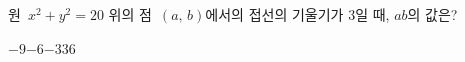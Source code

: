 원~$x^2+y^2=20$ 위의 점~$(a,\,b)$에서의 접선의 기울기가 $3$일 때, $ab$의 값은?
\begin{choices32}{$-9$}{$-6$}{$-3$}{$3$}{$6$}\end{choices32}
